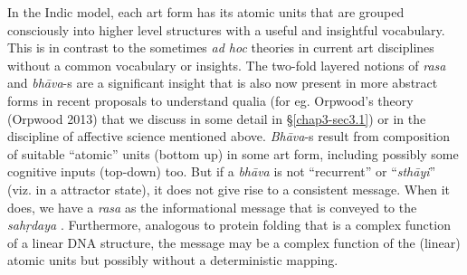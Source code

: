 In the Indic model, each art form has its atomic units that are grouped consciously into higher level structures with a useful and insightful vocabulary. This is in contrast to the sometimes \textsl{ad hoc} theories in current art disciplines without a common vocabulary or insights. The two-fold layered notions of \textsl{rasa} and \textsl{bhāva}-s are a significant insight that is also now present in more abstract forms in recent proposals to understand qualia (for eg. Orpwood’s theory (Orpwood 2013) that we discuss in some detail in \S\ref{chap3-sec3.1}) or in the discipline of affective science mentioned above. \textsl{Bhāva}-s result from composition of suitable “atomic” units (bottom up) in some art form, including possibly some cognitive inputs (top-down) too. But if a \textsl{bhāva} is not “recurrent” or “\textsl{sthāyi}” (viz. in a attractor state), it does not give rise to a consistent message. When it does, we have a \textsl{rasa} as the informational message that is conveyed to the \textsl{sahṛdaya}
. Furthermore, analogous to protein folding that is a complex function of a linear DNA structure, the message may be a complex function of the (linear) atomic units but possibly without a deterministic mapping.

